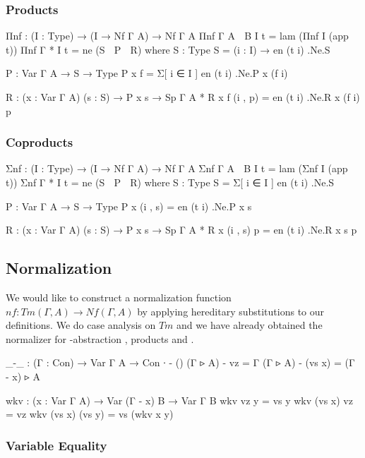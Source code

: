 \subsubsection*{Products}

\begin{code}
Πnf : (I : Type) → (I → Nf Γ A) → Nf Γ A
Πnf {Γ} {A ⇒ B} I t⃗ = lam (Πnf I (app ∘ t⃗))
Πnf {Γ} {*} I t⃗ = ne (S ◃ P ◃ R)
  where
  S : Type
  S = (i : I) → en (t⃗ i) .Ne.S

  P : Var Γ A → S → Type
  P x f = Σ[ i ∈ I ] en (t⃗ i) .Ne.P x (f i)

  R : (x : Var Γ A) (s : S) → P x s → Sp Γ A *
  R x f (i , p) = en (t⃗ i) .Ne.R x (f i) p
\end{code}

\subsubsection*{Coproducts}

\begin{code}
Σnf : (I : Type) → (I → Nf Γ A) → Nf Γ A
Σnf {Γ} {A ⇒ B} I t⃗ = lam (Σnf I (app ∘ t⃗))
Σnf {Γ} {*} I t⃗ = ne (S ◃ P ◃ R)
  where
  S : Type
  S = Σ[ i ∈ I ] en (t⃗ i) .Ne.S

  P : Var Γ A → S → Type
  P x (i , s) = en (t⃗ i) .Ne.P x s

  R : (x : Var Γ A) (s : S) → P x s → Sp Γ A *
  R x (i , s) p = en (t⃗ i) .Ne.R x s p
\end{code}

\subsection{Normalization}

We would like to construct a normalization function $nf : Tm(\Gamma,A) \to Nf(\Gamma,A)$ by applying hereditary substitutions to our definitions. We do case analysis on $Tm$ and we have already obtained the normalizer for \lambda-abstraction , products  and .

\begin{code}[hide]
_-_ : (Γ : Con) → Var Γ A → Con
∙ - ()
(Γ ▹ A) - vz = Γ
(Γ ▹ A) - (vs x) = (Γ - x) ▹ A

wkv : (x : Var Γ A) → Var (Γ - x) B → Var Γ B
wkv vz y = vs y
wkv (vs x) vz = vz
wkv (vs x) (vs y) = vs (wkv x y)
\end{code}

\subsubsection*{Variable Equality}

